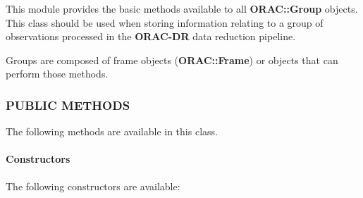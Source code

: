 This module provides the basic methods available to all
\textbf{ORAC::Group} objects. This class should be used when 
storing information relating to a group of observations
processed in the \textbf{ORAC-DR} data reduction pipeline.



Groups are composed of frame objects (\textbf{ORAC::Frame})
or objects that can perform those methods.

\subsubsection*{PUBLIC METHODS\label{ORAC::Group_PUBLIC_METHODS}}


The following methods are available in this class.

\paragraph*{Constructors\label{ORAC::Group_Constructors}}


The following constructors are available:

